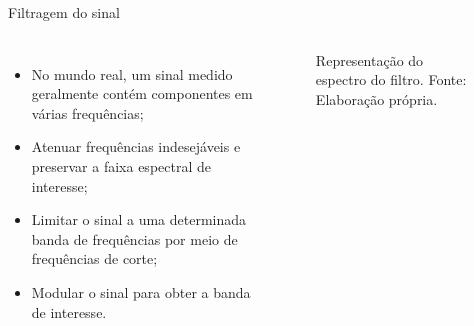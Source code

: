 \documentclass{beamer}
\begin{document}
\begin{frame}{Filtragem do sinal}

\begin{columns}

    \begin{itemize}
        \item No mundo real, um sinal medido geralmente contém
              componentes em várias frequências;
        \item Atenuar frequências indesejáveis e preservar a faixa
              espectral de interesse;
        \item Limitar o sinal a uma determinada banda de frequências
              por meio de frequências de corte;
        \item Modular o sinal para obter a banda de interesse.
    \end{itemize}


    \begin{figure}
    \centering
    \hspace*{0.08\textwidth}

    \caption{Representação do espectro do filtro. Fonte: Elaboração própria.}
    \label{fig2}
\end{figure}

\end{columns}
    
\end{frame}
\end{document}
